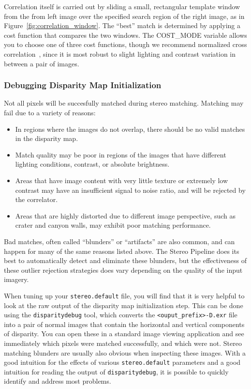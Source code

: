 Correlation itself is carried out by sliding a small, rectangular
template window from the from left image over the specified search
region of the right image, as in Figure~\ref{fig:correlation_window}.
The ``best'' match is determined by applying a cost function that
compares the two windows.  The COST\_MODE variable allows you to
choose one of three cost functions, though we recommend normalized
cross correlation~\cite{Menard97:robust}, since it is most robust to
slight lighting and contrast variation in between a pair of images.

\subsubsection{Debugging Disparity Map Initialization}

Not all pixels will be succesfully matched during stereo matching.
Matching may fail due to a variety of reasons:

\begin{itemize}
\item In regions where the images do not overlap, there should be no
  valid matches in the disparity map.
\item Match quality may be poor in regions of the images that have
  different lighting conditions, contrast, or absolute brightness.  
\item Areas that have image content with very little texture or
  extremely low contrast may have an insufficient signal to noise
  ratio, and will be rejected by the correlator.
\item Areas that are highly distorted due to different image
  perspective, such as crater and canyon walls, may exhibit poor
  matching performance.
\end{itemize}

Bad matches, often called ``blunders'' or ``artifacts'' are also
common, and can happen for many of the same reasons listed above.  The
Stereo Pipeline does its best to automatically detect and eliminate
these blunders, but the effectiveness of these outlier rejection
strategies does vary depending on the quality of the input imagery.

When tuning up your {\tt stereo.default} file, you will find that it
is very helpful to look at the raw output of the disparity map
initialization step.  This can be done using the {\tt disparitydebug}
tool, which converts the {\tt <ouput\_prefix>-D.exr} file into a pair
of normal images that contain the horizontal and vertical components
of disparity.  You can open these in a standard image viewing
application and see immediately which pixels were matched
successfully, and which were not.  Stereo matching blunders are
usually also obvious when inspecting these images.  With a good
intuition for the effects of various {\tt stereo.default} parameters
and a good intuition for reading the output of {\tt disparitydebug},
it is possible to quickly identify and address most problems.

